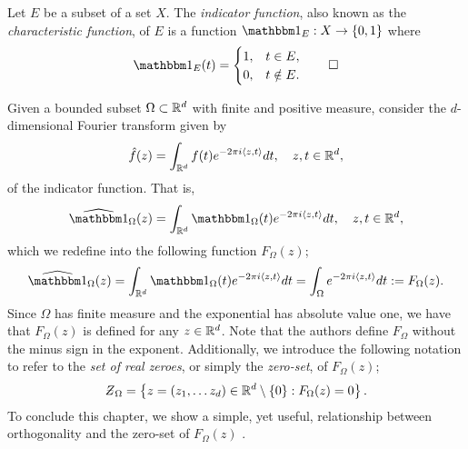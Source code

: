 \documentclass[../thesis.tex]{subfiles}
\begin{document}
\begin{definition}\label{def:indicator}
    Let $E$ be a subset of a set $X$. The \emph{indicator function}, also known as the \emph{characteristic function}, of $E$ is a function $\indicatorNoVar{E}: X \rightarrow \braq{0,1}$ where
    \begin{equation*}
        \indicator{E}{t}  = 
        \begin{cases} 
            1, &  t\in E,\\
            0, &  t \notin E.
        \end{cases}
        \qedhere
    \end{equation*}
\end{definition}

Given a bounded subset $\Omega\subset \mathbb{R}^d$ with finite and positive measure, consider the $d$-dimensional Fourier transform given by
\begin{equation*}
    \hat{f}(z) = \int_{\mathbb{R}^d} f(t)  e^{-2\pi i \langle z,t\rangle} dt, \quad z,t\in \mathbb{R}^d,
\end{equation*}
of the indicator function. That is, 
\begin{equation*}
    \indicatorFourier{\Omega}{z} = \int_{\R^d} \indicator{\Omega}{t}  e^{-2\pi i \braa{z,t}} dt, \quad z,t\in \R^d,
\end{equation*} 
which we redefine into the following function $F_{\Omega}(z)$;
\begin{equation}\label{eq:f_omega}
    \indicatorFourier{\Omega}{z} = \int_{\R^d} \indicator{\Omega}{t}  e^{-2\pi i \braa{z,t}} dt = \int_{\Omega} e^{-2\pi i \braa{z,t}} dt := F_{\Omega}(z).
\end{equation}
Since $\Omega$ has finite measure and the exponential has absolute value one, we have that $F_{\Omega}(z)$ is defined for any $z \in \mathbb{R}^d$. Note that the authors \cite{jorgensenSpectralPairsCartesian2001} define $F_{\Omega}$ without the minus sign in the exponent. Additionally, we introduce the following notation to refer to the \emph{set of real zeroes}, or simply the \emph{zero-set}, of $F_{\Omega}(z)$;
\begin{equation*}
    \Zstroke_{\Omega} = \braqMed{ z  = (z_1, \dots z_d) \in \R^d \setminus \braqMed{0} : F_{\Omega}(z)= 0}.
\end{equation*}
To conclude this chapter, we show a simple, yet useful, relationship between orthogonality and the zero-set of $F_{\Omega}(z)$ \cite{lagariasOrthonormalBasesExponentials2000,jorgensenSpectralPairsCartesian2001}. %
\end{document}
